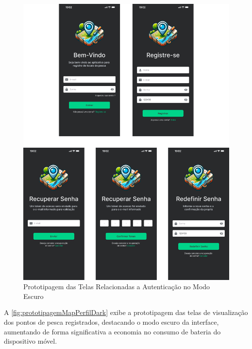\begin{figure}[H]
    \centering
    \caption{Prototipagem das Telas Relacionadas a Autenticação no Modo Escuro}
    \label{fig:prototipagemAutenticacaoUsuarioDark}
    \includegraphics[scale=0.30]{./dados/figuras/prototipagem-dark-autenticacao-user.png}
\end{figure}

A \autoref{fig:prototipagemMapPerfilDark} exibe a prototipagem das telas de visualização dos pontos de pesca registrados, destacando o modo escuro da interface, aumentando de forma significativa a economia no consumo de bateria do dispositivo móvel.

